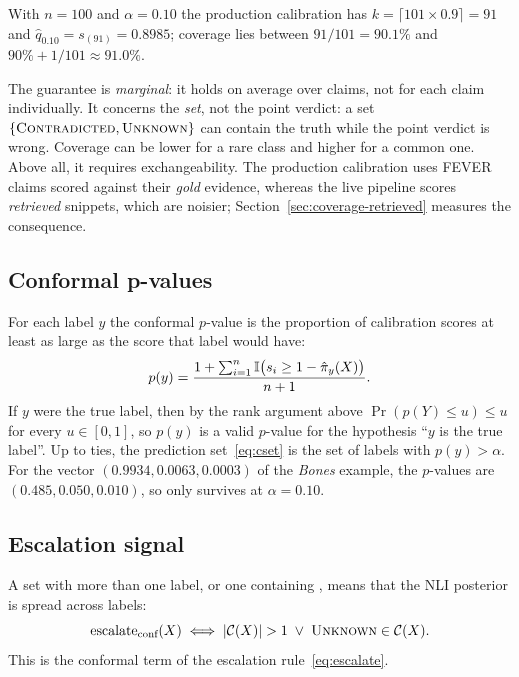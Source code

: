 With $n = 100$ and $\alpha = 0.10$ the production calibration has $k = \lceil 101 \times 0.9 \rceil = 91$ and $\hat{q}_{0.10} = s_{(91)} = 0.8985$; coverage lies between $91/101 = 90.1\%$ and $90\% + 1/101 \approx 91.0\%$.

\begin{remark}
The guarantee is \emph{marginal}: it holds on average over claims, not for each claim individually. It concerns the \emph{set}, not the point verdict: a set $\{\textsc{Contradicted}, \textsc{Unknown}\}$ can contain the truth while the point verdict \Con{} is wrong. Coverage can be lower for a rare class and higher for a common one. Above all, it requires exchangeability. The production calibration uses FEVER claims scored against their \emph{gold} evidence, whereas the live pipeline scores \emph{retrieved} snippets, which are noisier; Section~\ref{sec:coverage-retrieved} measures the consequence.
\end{remark}

\subsection{Conformal p-values}

For each label $y$ the conformal $p$-value is the proportion of calibration scores at least as large as the score that label would have:
\begin{equation}
  p(y) = \frac{1 + \sum_{i=1}^{n} \mathbb{I}\bigl( s_i \ge 1 - \hat{\pi}_y(X) \bigr)}{n+1}.
\end{equation}
If $y$ were the true label, then by the rank argument above $\Pr(p(Y) \le u) \le u$ for every $u \in [0,1]$, so $p(y)$ is a valid $p$-value for the hypothesis ``$y$ is the true label''. Up to ties, the prediction set~\eqref{eq:cset} is the set of labels with $p(y) > \alpha$. For the vector $(0.9934, 0.0063, 0.0003)$ of the \emph{Bones} example, the $p$-values are $(0.485, 0.050, 0.010)$, so only \Con{} survives at $\alpha = 0.10$.

\subsection{Escalation signal}

A set with more than one label, or one containing \Unk, means that the NLI posterior is spread across labels:
\begin{equation}
  \text{escalate}_{\text{conf}}(X) \iff \lvert \mathcal{C}(X) \rvert > 1 \;\vee\; \textsc{Unknown} \in \mathcal{C}(X).
\end{equation}
This is the conformal term of the escalation rule~\eqref{eq:escalate}.


